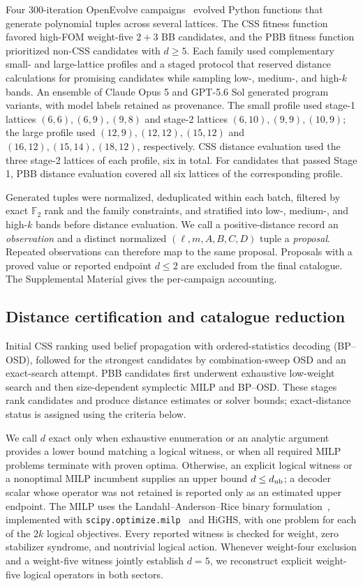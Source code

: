 \documentclass[aps,prx,twocolumn,superscriptaddress,nofootinbib,floatfix]{revtex4-2}
\newcommand{\FF}{\ensuremath{\mathbb{F}}}
\begin{document}
Four 300-iteration OpenEvolve campaigns~\cite{openevolve} evolved Python
functions that generate polynomial tuples across several lattices.  The CSS
fitness function favored high-FOM weight-five $2+3$ BB candidates, and the PBB
fitness function prioritized non-CSS candidates with $d\geq5$.  Each family
used complementary small- and large-lattice profiles and a staged protocol
that reserved distance calculations for promising candidates while sampling
low-, medium-, and high-$k$ bands.  An ensemble of Claude Opus 5 and GPT-5.6
Sol generated program variants, with model labels retained as provenance.
The small profile used stage-1 lattices
$(6,6),(6,9),(9,8)$ and stage-2 lattices $(6,10),(9,9),(10,9)$; the large
profile used $(12,9),(12,12),(15,12)$ and
$(16,12),(15,14),(18,12)$, respectively.  CSS distance evaluation used the
three stage-2 lattices of each profile, six in total.  For candidates that
passed Stage 1, PBB distance evaluation covered all six lattices of the
corresponding profile.

Generated tuples were normalized, deduplicated within each batch, filtered by
exact $\FF_2$ rank and the family constraints, and stratified into low-,
medium-, and high-$k$ bands before distance evaluation.  We call a
positive-distance record an \emph{observation} and a distinct normalized
$(\ell,m,A,B,C,D)$ tuple a \emph{proposal}.  Repeated observations can therefore
map to the same proposal.  Proposals with a proved value or reported endpoint
$d\leq2$ are excluded from the final catalogue.  The Supplemental Material gives the
per-campaign accounting.

\subsection{Distance certification and catalogue reduction}

Initial CSS ranking used belief propagation with ordered-statistics decoding
(BP--OSD), followed for the strongest candidates by combination-sweep OSD and
an exact-search attempt.  PBB candidates first underwent exhaustive
low-weight search and then size-dependent symplectic MILP and BP--OSD.  These
stages rank candidates and produce distance estimates or solver bounds;
exact-distance status is assigned using the criteria below.

We call $d$ exact only when exhaustive enumeration or an analytic argument
provides a lower bound matching a logical witness, or when all required MILP
problems terminate with proven optima.  Otherwise, an explicit logical witness
or a nonoptimal MILP incumbent supplies an upper bound $d\leq d_{\rm ub}$; a
decoder scalar whose operator was not retained is reported only as an estimated
upper endpoint.  The MILP uses the
Landahl--Anderson--Rice binary formulation~\cite{landahl2011color}, implemented
with \texttt{scipy.optimize.milp}~\cite{virtanen2020scipy} and HiGHS, with one
problem for each of the $2k$ logical objectives.  Every reported witness is
checked for weight, zero stabilizer syndrome, and nontrivial logical action.
Whenever weight-four exclusion and a weight-five witness jointly establish
$d=5$, we reconstruct explicit weight-five logical operators in both sectors.
\end{document}
